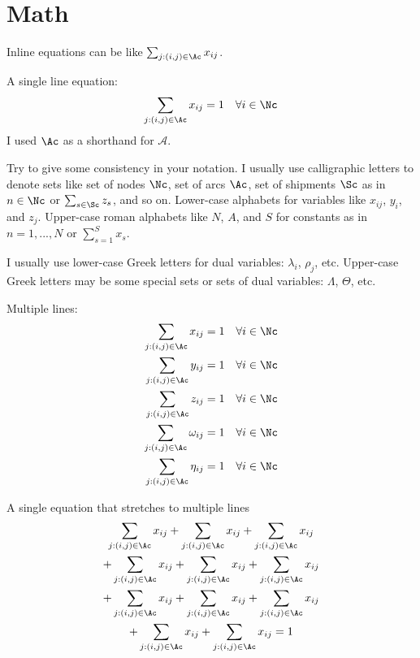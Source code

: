 \documentclass[letterpaper, 11pt]{article}
\begin{document}
\section{Math} \label{sec:math}
Inline equations can be like $\sum_{j:(i,j)\in\Ac} x_{ij}$.

A single line equation:
\begin{equation}
	\sum_{j:(i,j)\in\Ac} x_{ij} = 1 \quad \forall i\in\Nc \label{node_constraint1}
\end{equation}
I used $\Ac$ as a shorthand for $\mathcal{A}$. 

Try to give some consistency in your notation. I usually use calligraphic letters to denote sets like set of nodes $\Nc$, set of arcs $\Ac$, set of shipments $\Sc$ as in $n\in\Nc$ or $\sum_{s\in\Sc} z_s$, and so on. Lower-case alphabets for variables like $x_{ij}$, $y_i$, and $z_j$. Upper-case roman alphabets like $N$, $A$, and $S$ for constants as in $n=1,...,N$ or $\sum_{s=1}^S x_s$. 

I usually use lower-case Greek letters for dual variables: $\lambda_i$, $\rho_j$, etc. Upper-case Greek letters may be some special sets or sets of dual variables: $\Lambda$, $\Theta$, etc.

Multiple lines:
\begin{align}
	\sum_{j:(i,j)\in\Ac} x_{ij} = 1 \quad & \forall i\in\Nc \label{node_constraint2} \\
	\sum_{j:(i,j)\in\Ac} y_{ij} = 1 \quad & \forall i\in\Nc \nonumber \\
	\sum_{j:(i,j)\in\Ac} z_{ij} = 1 \quad & \forall i\in\Nc \label{node_constraint3} \\
	\sum_{j:(i,j)\in\Ac} \omega_{ij} = 1 \quad & \forall i\in\Nc \label{node_constraint4} \\
	\sum_{j:(i,j)\in\Ac} \eta_{ij} = 1 \quad & \forall i\in\Nc \label{node_constraint5} 
\end{align}

A single equation that stretches to multiple lines
\begin{multline}
	\sum_{j:(i,j)\in\Ac} x_{ij} + \sum_{j:(i,j)\in\Ac} x_{ij} + \sum_{j:(i,j)\in\Ac} x_{ij} \\
	+ \sum_{j:(i,j)\in\Ac} x_{ij} +	\sum_{j:(i,j)\in\Ac} x_{ij} + \sum_{j:(i,j)\in\Ac} x_{ij} \\
	+ \sum_{j:(i,j)\in\Ac} x_{ij} +	\sum_{j:(i,j)\in\Ac} x_{ij} + \sum_{j:(i,j)\in\Ac} x_{ij} \\
	+ \sum_{j:(i,j)\in\Ac} x_{ij} + \sum_{j:(i,j)\in\Ac} x_{ij} = 1 
\end{multline}
\end{document}
